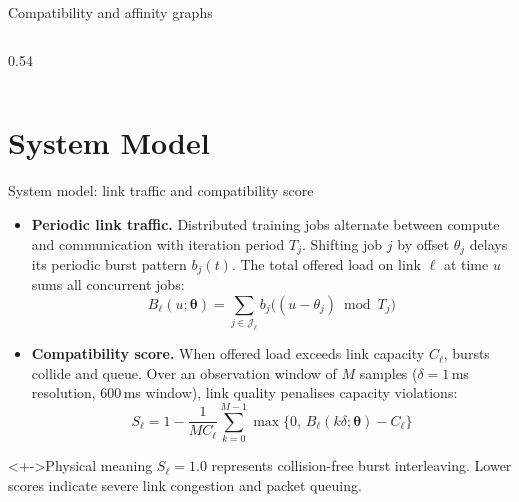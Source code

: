 \documentclass[aspectratio=169,11pt,c]{beamer}
\begin{document}
\begin{frame}{Compatibility and affinity graphs}
\begin{columns}[c]
\begin{column}{0.54\textwidth}
{}
    \end{column}
  \end{columns}
\end{frame}

\section{System Model}

\begin{frame}{System model: link traffic and compatibility score}
  \footnotesize
  \setlength{\abovedisplayskip}{3pt}
  \setlength{\belowdisplayskip}{3pt}
  \begin{itemize}[<+->]
    \item \textbf{Periodic link traffic.} Distributed training jobs alternate between compute and communication with iteration period $T_j$. Shifting job $j$ by offset $\theta_j$ delays its periodic burst pattern $b_j(t)$. The total offered load on link $\ell$ at time $u$ sums all concurrent jobs:
    \[ B_\ell(u;\boldsymbol{\theta}) = \sum_{j \in \mathcal{J}_\ell} b_j\big((u - \theta_j) \bmod T_j\big) \]

    \item \textbf{Compatibility score.} When offered load exceeds link capacity $C_\ell$, bursts collide and queue. Over an observation window of $M$ samples ($\delta = 1$\,ms resolution, 600\,ms window), link quality penalises capacity violations:
    \[ S_\ell = 1 - \frac{1}{M C_\ell} \sum_{k=0}^{M-1} \max\big\{0,\, B_\ell(k\delta;\boldsymbol{\theta}) - C_\ell\big\} \]
  \end{itemize}
  \vspace{-0.3em}
  \begin{block}<+->{Physical meaning}
    \scriptsize $S_\ell = 1.0$ represents collision-free burst interleaving. Lower scores indicate severe link congestion and packet queuing.
  \end{block}
\end{frame}
\end{document}
